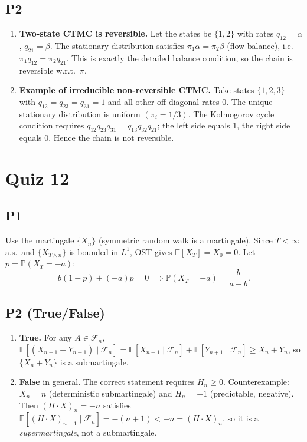 \documentclass[11pt]{article}
\newcommand{\PP}{\mathbb{P}}
\newcommand{\EE}{\mathbb{E}}
\newcommand{\1}{\mathbf{1}}
\begin{document}
\subsection*{P2}
\begin{enumerate}
\item \textbf{Two-state CTMC is reversible.}  Let the states be $\{1,2\}$ with rates $q_{12}=\alpha$, $q_{21}=\beta$.  The stationary distribution satisfies $\pi_1\alpha=\pi_2\beta$ (flow balance), i.e.\ $\pi_1 q_{12}=\pi_2 q_{21}$.  This is exactly the detailed balance condition, so the chain is reversible w.r.t.\ $\pi$.
\item \textbf{Example of irreducible non-reversible CTMC.}  Take states $\{1,2,3\}$ with $q_{12}=q_{23}=q_{31}=1$ and all other off-diagonal rates $0$.  The unique stationary distribution is uniform $(\pi_i=1/3)$.  The Kolmogorov cycle condition requires $q_{12}q_{23}q_{31}=q_{13}q_{32}q_{21}$; the left side equals 1, the right side equals 0.  Hence the chain is not reversible.
\end{enumerate}

\section{Quiz 12}

\subsection*{P1}
Use the martingale $\{X_n\}$ (symmetric random walk is a martingale).  Since $T<\infty$ a.s.\ and $\{X_{T\wedge n}\}$ is bounded in $L^1$, OST gives $\EE[X_T]=X_0=0$.  Let $p=\PP(X_T=-a)$:
\[
b(1-p)+(-a)p=0\implies\PP(X_T=-a)=\frac{b}{a+b}.
\]

\subsection*{P2 (True/False)}
\begin{enumerate}
\item \textbf{True.} For any $A\in\mathcal F_n$,
$\EE[(X_{n+1}+Y_{n+1})\mid\mathcal F_n]=\EE[X_{n+1}\mid\mathcal F_n]+\EE[Y_{n+1}\mid\mathcal F_n]\ge X_n+Y_n$,
so $\{X_n+Y_n\}$ is a submartingale.
\item \textbf{False} in general.  The correct statement requires $H_n\ge0$.  Counterexample: $X_n=n$ (deterministic submartingale) and $H_n=-1$ (predictable, negative).  Then $(H\cdot X)_n=-n$ satisfies $\EE[(H\cdot X)_{n+1}\mid\mathcal F_n]=-(n+1)<-n=(H\cdot X)_n$, so it is a \emph{supermartingale}, not a submartingale.
\end{enumerate}
\end{document}
